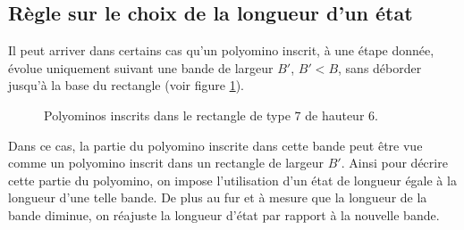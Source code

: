 \begin{Rem}\label{reg}
\begin{spacing}{0.27}
\section*{Règle sur le choix de la longueur d'un état}
\end{spacing}
Il peut arriver dans certains cas qu'un polyomino inscrit, à une étape donnée, évolue  uniquement suivant une bande  de largeur $B'$, $B'< B$, sans  déborder jusqu'à la base du  rectangle (voir figure \ref{ATfig5}).
\begin{figure}[!htb]
\begin{minipage}[c]{.30\linewidth}
        \centering
\end{minipage}
\hfill
\begin{minipage}[c]{.95\linewidth}
\begin{minipage}[c]{.30\linewidth}
        \centering
\begin{logicpuzzle}[rows=6,columns=7,color=cyan!100,width=750px,scale=0.5]
\framepuzzle[black!50]
\end{logicpuzzle}
\end{minipage}
\hfill
\begin{minipage}[c]{.36\linewidth}
        \centering
\begin{logicpuzzle}[rows=6,columns=7,color=cyan!100, width=750px,scale=0.5]
\framepuzzle[black!50]
\end{logicpuzzle}
\end{minipage}
\end{minipage}
 \caption{\label{ATfig5} Polyominos inscrits dans le rectangle de type $7$ de hauteur $6$.}
\end{figure} 

 Dans ce cas, la partie du polyomino inscrite dans cette bande peut être vue comme un polyomino inscrit dans un rectangle de largeur $B'$.  Ainsi pour décrire cette partie du polyomino, on impose l'utilisation d'un état de longueur égale à la longueur d'une telle bande. De plus au fur et à mesure que la longueur de la bande diminue, on réajuste la longueur d'état par rapport à la nouvelle bande.
\end{Rem} 
